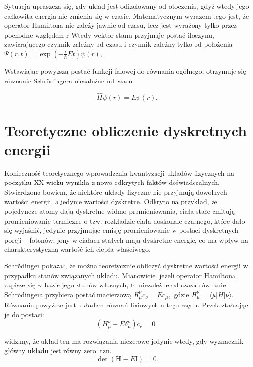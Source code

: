 \documentclass{article}
\begin{document}
Sytuacja upraszcza się, gdy układ jest odizolowany od otoczenia, gdyż wtedy jego całkowita energia nie zmienia się w czasie. Matematycznym wyrazem tego jest, że operator Hamiltona nie zależy jawnie od czasu, lecz jest wyrażony tylko przez pochodne względem r Wtedy wektor stanu przyjmuje postać iloczynu, zawierającego czynnik zależny od czasu i czynnik zależny tylko od położenia 
\begin{math}
{ \Psi (r,t)=\exp \left(-{\frac {i}{\hbar }}Et\right)\psi (r),}
\end{math}

Wstawiając powyższą postać funkcji falowej do równania ogólnego, otrzymuje się równanie Schrödingera niezależne od czasu 

$$ {\hat  {H}}\psi (r)=E\psi (r). $$

\section{Teoretyczne obliczenie dyskretnych energii}
Konieczność teoretycznego wprowadzenia kwantyzacji układów fizycznych na początku XX wieku wynikła z nowo odkrytych faktów doświadczalnych. Stwierdzono bowiem, że niektóre układy fizyczne nie przyjmują dowolnych wartości energii, a jedynie wartości dyskretne. Odkryto na przykład, że pojedyncze atomy dają dyskretne widmo promieniowania, ciała stałe emitują promieniowanie termiczne o tzw. rozkładzie ciała doskonale czarnego, które dało się wyjaśnić, jedynie przyjmując emisję promieniowanie w postaci dyskretnych porcji – fotonów; jony w ciałach stałych mają dyskretne energie, co ma wpływ na charakterystyczną wartość ich ciepła właściwego.

Schrödinger pokazał, że można teoretycznie obliczyć dyskretne wartości energii w przypadku stanów związanych układu. Mianowicie, jeżeli operator Hamiltona zapisze się w bazie jego stanów własnych, to niezależne od czasu równanie Schrödingera przybiera postać macierzową 
${ H_{\mu }^{\nu }c_{\nu }=Ec_{\mu },}$
gdzie ${ H_{\mu }^{\nu }=\langle \mu |H|\nu \rangle .}$ Równanie powyższe jest układem równań liniowych n-tego rzędu. Przekształcając je do postaci:
$${ (H_{\mu }^{\nu }-E\delta _{\mu }^{\nu })c_{\nu }=0,}$$

widzimy, że układ ten ma rozwiązania niezerowe jedynie wtedy, gdy wyznacznik główny układu jest równy zero, tzn. 
$${ \det(\mathbf {H} -E\mathbf {I} )=0.}$$
\end{document}
